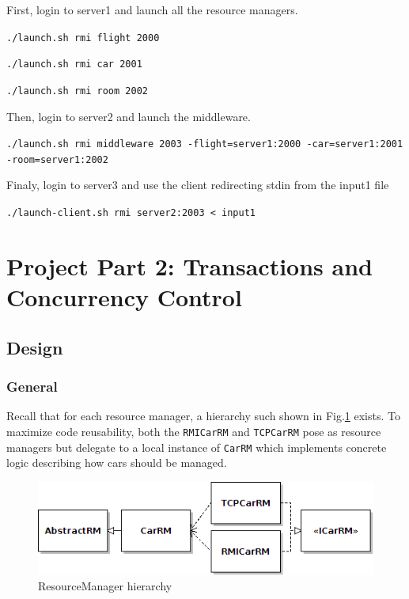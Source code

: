 \documentclass[a4paper]{article}
\begin{document}
First, login to server1 and launch all the resource managers.

{\tt ./launch.sh rmi flight 2000}

{\tt ./launch.sh rmi car 2001}

{\tt ./launch.sh rmi room 2002}

Then, login to server2 and launch the middleware.

{\tt ./launch.sh rmi middleware 2003 -flight=server1:2000 -car=server1:2001 -room=server1:2002}

Finaly, login to server3 and use the client redirecting stdin from the input1 file
 
{\tt ./launch-client.sh rmi server2:2003 < input1}

\section{Project Part 2: Transactions and Concurrency Control}
\subsection{Design}
\subsubsection{General}

Recall that for each resource manager, a hierarchy such shown in Fig.\ref{carrm} exists. To maximize code reusability, both the \texttt{RMICarRM} and \texttt{TCPCarRM} pose as resource managers but delegate to a local instance of 
\texttt{CarRM} which implements concrete logic describing how cars should be managed.
 
\begin{figure}[h!]
  \centering
	\includegraphics[scale=0.6]{carrm.png}
  \caption{ResourceManager hierarchy}
  \label{carrm}
\end{figure}
\end{document}
